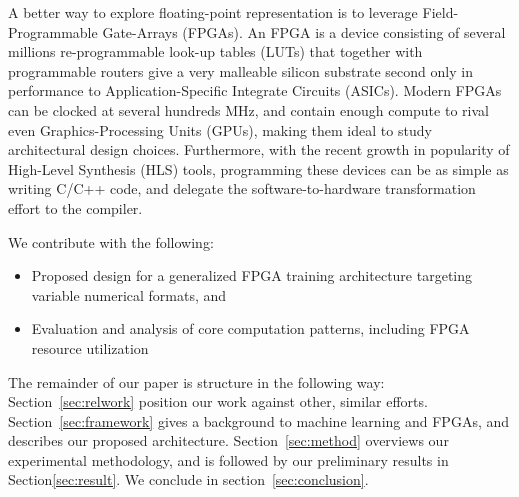 \documentclass[techrep,english]{ipsj}
\begin{document}
A better way to explore floating-point representation is to leverage Field-Programmable Gate-Arrays (FPGAs). An FPGA is a device consisting of several millions re-programmable look-up tables (LUTs) that together with programmable routers give a very malleable silicon substrate second only in performance to Application-Specific Integrate Circuits (ASICs). Modern FPGAs can be clocked at several hundreds MHz, and contain enough compute to rival even Graphics-Processing Units (GPUs), making them ideal to study architectural design choices. Furthermore, with the recent growth in popularity of High-Level Synthesis (HLS) tools, programming these devices can be as simple as writing C/C++ code, and delegate the software-to-hardware transformation effort to the compiler.

We contribute with the following:
\begin{itemize}
\item Proposed design for a generalized FPGA training architecture targeting variable numerical formats, and
\item Evaluation and analysis of core computation patterns, including FPGA resource utilization
\end{itemize}

The remainder of our paper is structure in the following way: Section~\ref{sec:relwork} position our work against other, similar efforts. Section~\ref{sec:framework} gives a background to machine learning and FPGAs, and describes our proposed architecture. Section~\ref{sec:method} overviews our experimental methodology, and is followed by our preliminary results in Section\`\ref{sec:result}. We conclude in section~\ref{sec:conclusion}.
\end{document}
